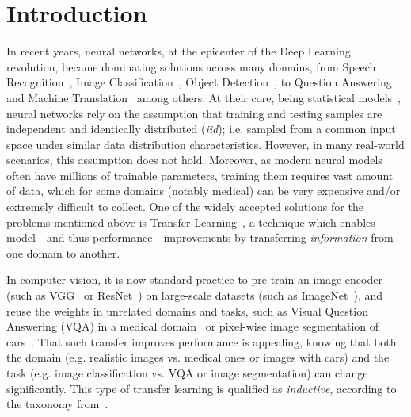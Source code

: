 \section{Introduction}
In recent years, neural networks, at the epicenter of the Deep Learning~\cite{lecun2015deep} revolution, became dominating solutions across many domains, from  Speech Recognition~\cite{graves2013speech}, Image Classification~\cite{krizhevsky2012imagenet}, Object Detection~\cite{redmon2016you}, to Question Answering~\cite{weston2014memory} and Machine Translation~\cite{bahdanau2014neural} among others.
At their core, being statistical models~\cite{ripley1993statistical,warner1996understanding}, neural networks rely on the assumption that training and testing samples are independent and identically distributed (\textit{iid}); i.e. sampled from a common input space under similar data distribution characteristics.
However, in many real-world scenarios, this assumption does not hold. Moreover, as modern neural models often have  millions of trainable parameters, training them requires vast amount of data, which for some domains (notably medical) can be very expensive and/or extremely difficult to collect.
One of the widely accepted solutions for the problems mentioned above is Transfer Learning~\cite{pan2009survey,weiss2016survey}, a technique which enables model - and thus performance - improvements by transferring \emph{information} from one domain to another.


In computer vision, it is now standard practice to pre-train an image encoder (such as VGG~\cite{simonyan2014very} or ResNet~\cite{he2016deep}) on large-scale datasets (such as ImageNet~\cite{deng2009imagenet}), and reuse the weights in unrelated domains and tasks, such as Visual Question Answering (VQA) in a medical domain~\cite{kornuta2019leveraging} or pixel-wise image segmentation of cars~\cite{iglovikov2018ternausnet}.
That such transfer improves performance is appealing, knowing that both the domain (e.g. realistic images vs. medical ones or images with cars) and the task (e.g. image classification vs. VQA or image segmentation) can change significantly. This type of transfer learning is qualified as \emph{inductive}, according to the taxonomy from~\cite{pan2009survey}.

